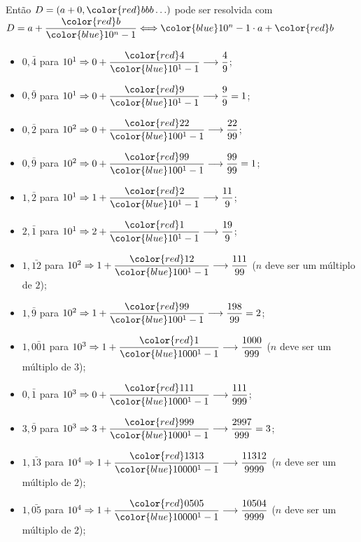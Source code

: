 	Então $ D = (a + 0,\color{red}bbb \hdots) $ pode ser resolvida com $ D = a + \dfrac{\color{red}b}{\color{blue}10^n - 1} \Longleftrightarrow {\color{blue}10^n - 1} \cdot a + \color{red}b $
	
	\begin{itemize}
		\item $ 0,\bar{4} $ para $ 10^1 \Rightarrow 0 + \dfrac{\color{red}4}{\color{blue}10^1 - 1} \longrightarrow \dfrac{4}{9} $;
		\item $ 0,\bar{9} $ para $ 10^1 \Rightarrow 0 + \dfrac{\color{red}9}{\color{blue}10^1 - 1} \longrightarrow \dfrac{9}{9} = 1 $;
		
		\item $ 0,\bar{2} $ para $ 10^2 \Rightarrow 0 + \dfrac{\color{red}22}{\color{blue}100^1 - 1} \longrightarrow \dfrac{22}{99} $;
		\item $ 0,\bar{9} $ para $ 10^2 \Rightarrow 0 + \dfrac{\color{red}99}{\color{blue}100^1 - 1} \longrightarrow \dfrac{99}{99} = 1 $;
		
		\item $ 1,\bar{2} $ para $ 10^1 \Rightarrow 1 + \dfrac{\color{red}2}{\color{blue}10^1 - 1} \longrightarrow \dfrac{11}{9} $;
		\item $ 2,\bar{1} $ para $ 10^1 \Rightarrow 2 + \dfrac{\color{red}1}{\color{blue}10^1 - 1} \longrightarrow \dfrac{19}{9} $;
		
		\item $ 1,\bar{12} $ para $ 10^2 \Rightarrow 1 + \dfrac{\color{red}12}{\color{blue}100^1 - 1} \longrightarrow \dfrac{111}{99} $ ($n$ deve ser um múltiplo de $2$);
		\item $ 1,\bar{9} $ para $ 10^2 \Rightarrow 1 + \dfrac{\color{red}99}{\color{blue}100^1 - 1} \longrightarrow \dfrac{198}{99} = 2 $;
		
		\item $ 1,\bar{001} $ para $ 10^3 \Rightarrow 1 + \dfrac{\color{red}1}{\color{blue}1000^1 - 1} \longrightarrow \dfrac{1000}{999} $ ($n$ deve ser um múltiplo de $3$);
		\item $ 0,\bar{1} $ para $ 10^3 \Rightarrow 0 + \dfrac{\color{red}111}{\color{blue}1000^1 - 1} \longrightarrow \dfrac{111}{999} $;
		\item $ 3,\bar{9} $ para $ 10^3 \Rightarrow 3 + \dfrac{\color{red}999}{\color{blue}1000^1 - 1} \longrightarrow \dfrac{2997}{999} = 3 $;
		
		\item $ 1,\bar{13} $ para $ 10^4 \Rightarrow 1 + \dfrac{\color{red}1313}{\color{blue}10000^1 - 1} \longrightarrow \dfrac{11312}{9999} $ ($n$ deve ser um múltiplo de $2$);
		\item $ 1,\bar{05} $ para $ 10^4 \Rightarrow 1 + \dfrac{\color{red}0505}{\color{blue}10000^1 - 1} \longrightarrow \dfrac{10504}{9999} $ ($n$ deve ser um múltiplo de $2$);
	\end{itemize}


